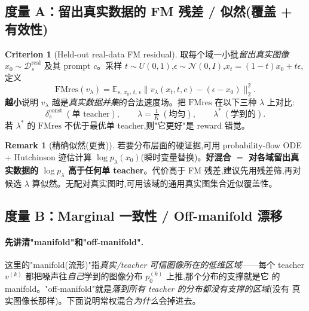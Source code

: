 \documentclass[11pt,a4paper]{article}
\newcommand{\E}{\mathbb{E}}
\newcommand{\N}{\mathcal{N}}
\newcommand{\const}{\mathrm{const}}
\newcommand{\dataD}{\mathcal{D}}
\theoremstyle{definition}
\newtheorem{remark}{Remark}
\newtheorem{criterion}{Criterion}
\begin{document}
\subsection{度量 A：留出真实数据的 FM 残差 / 似然(覆盖 + 有效性)}
\label{ssec:crit_fm}

\begin{criterion}[Held-out real-data FM residual]
\label{crit:fm}
取每个域一小批\emph{留出真实图像} $x_0\sim\dataD_s^{\text{real}}$ 及其 prompt
$c$。采样 $t\sim U(0,1)$,$\epsilon\sim\N(0,I)$,$x_t=(1-t)x_0+t\epsilon$,定义
\begin{equation}
\mathrm{FMres}(v_\lambda)=\E_{s,\,x_0,\,t,\,\epsilon}
\big\|v_\lambda(x_t,t,c)-(\epsilon-x_0)\big\|_2^2.
\end{equation}
\textbf{越小}说明 $v_\lambda$ 越是\emph{真实数据并集}的合法速度场。把
$\mathrm{FMres}$ 在以下三种 $\lambda$ 上对比:
\[
\delta_s^{\const}\ (\text{单 teacher}),\qquad
\lambda=\tfrac1K\ (\text{均匀}),\qquad
\lambda^*\ (\text{学到的}).
\]
若 $\lambda^*$ 的 $\mathrm{FMres}$ 不优于最优单 teacher,则"它更好"是 reward 错觉。
\end{criterion}

\begin{remark}[精确似然(更贵)]
若要分布层面的硬证据,可用 probability-flow ODE + Hutchinson 迹估计算
$\log p_\lambda(x_0)$(瞬时变量替换)。\textbf{好混合 $=$ 对各域留出真实数据的
$\log p_\lambda$ 高于任何单 teacher}。代价高于 FM 残差,建议先用残差筛,再对
候选 $\lambda$ 算似然。无配对真实图时,可用该域的通用真实图集合近似覆盖性。
\end{remark}

\subsection{度量 B：Marginal 一致性 / Off-manifold 漂移}
\label{ssec:crit_consistency}

\paragraph{先讲清"manifold"和"off-manifold".}
这里的"manifold(流形)"指\emph{真实/teacher 可信图像所在的低维区域}——每个 teacher
$v^{(k)}$ 都把噪声往\emph{自己}学到的图像分布 $p^{(k)}_0$ 上推,那个分布的支撑就是它
的 manifold。"off-manifold"就是\emph{落到所有 teacher 的分布都没有支撑的区域}(没有
真实图像长那样)。下面说明常权混合\emph{为什么}会掉进去。
\end{document}
